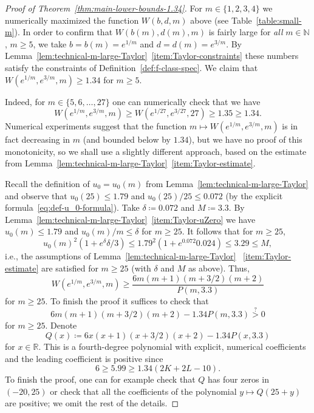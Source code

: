 \documentclass[a4paper]{amsart} %
\theoremstyle{definition}
\theoremstyle{remark}
\numberwithin{equation}{section}
\newcommand*{\RR}{\mathbb{R}}
\newcommand*{\NN}{\mathbb{N}}
\newcommand*{\XXXspecialbd}{W}
\begin{document}
\begin{proof}[Proof of Theorem~\ref{thm:main-lower-bounds-1.34}]
	For $m\in\{1,2,3,4\}$ we numerically maximized the function $\XXXspecialbd(b,d,m)$ above (see Table~\ref{table:small-m}).
	In order to  confirm that $\XXXspecialbd(b(m), d(m),m)$
	is fairly large for \emph{all} $m\in \NN$, $m\geq 5$, 
	we take $b =b(m)= e^{1/m}$ and $d = d(m) =e^{3/m}$.
	By Lemma~\ref{lem:technical-m-large-Taylor}~\ref{item:Taylor-constraints}
	these numbers satisfy the constraints of Definition~\ref{def:f-class-spec}. 
	We claim that $\XXXspecialbd(e^{1/m},e^{3/m},m) \geq 1.34$ for $m\geq 5$.
	
	
	
	Indeed, for $m\in\{5,6,\dots, 27\}$ 
	one can numerically check that we have
	\[
	\XXXspecialbd(e^{1/m},e^{3/m},m) \geq \XXXspecialbd(e^{1/27},e^{3/27},27) \geq 1.35 \geq 1.34.
	\]
	Numerical experiments suggest that the function $m\mapsto \XXXspecialbd(e^{1/m},e^{3/m},m)$ 
	is in fact decreasing in $m$ (and bounded below by $1.34$), 
	but we have no proof of this monotonicity, so we shall use a slightly different approach, based on the estimate from Lemma~\ref{lem:technical-m-large-Taylor}~\ref{item:Taylor-estimate}.
	
	Recall the definition of $u_0 = u_0(m)$ from Lemma~\ref{lem:technical-m-large-Taylor}
	and 
	observe that $u_0(25) \leq 1.79$ and $u_0(25)/25 \leq  0.072$
	(by the explicit formula~\eqref{eq:def-u_0-formula}).
	Take $\delta \coloneqq 0.072$ and $M \coloneqq 3.3$.
	By Lemma~\ref{lem:technical-m-large-Taylor}~\ref{item:Taylor-uZero}
	we have  $u_0(m) \leq 1.79$ and $u_0(m)/m \leq  \delta$ for $m\geq25$.
	It follows that for $m\geq 25$,
	\[
	u_0(m)^2 (1+e^{\delta} \delta/3) \leq 1.79^2(1+e^{0.072} 0.024) \leq 3.29 \leq M,
	\]
	i.e., the assumptions of Lemma~\ref{lem:technical-m-large-Taylor} ~\ref{item:Taylor-estimate}
	are satisfied for $m\geq 25$ (with $\delta$ and $M$ as above).
	Thus,
	\[
	\XXXspecialbd(e^{1/m},e^{3/m},m) \geq \frac{6m(m+1)(m+3/2)(m+2)}{P(m,3.3)}  
	\]
	for $m\geq 25$.
	To finish the proof it suffices to check that
	\[
	6m(m+1)(m+3/2)(m+2) - 1.34 P(m,3.3) \overset{?}{>} 0
	\]
	for $m\geq 25$.
	Denote
	\[
	Q(x) \coloneqq 6x(x+1)(x+3/2)(x+2) - 1.34 P(x,3.3)
	\]
	for $x\in\RR$. This is a fourth-degree  polynomial with explicit, numerical coefficients
	and the leading coefficient is positive since 
	\[
	6\geq 5.99 \geq 1.34(2K + 2L - 10).
	\]
	To finish the proof, one can for example check that $Q$ has four zeros in $(-20,25)$ or check that all the coefficients of the polynomial $y\mapsto Q(25+y)$ are positive; we omit the rest of the details.
\end{proof}
\end{document}
